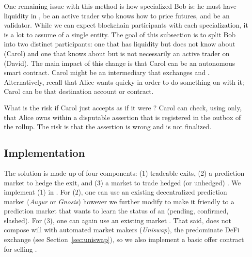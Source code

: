 One remaining issue with this method is how specialized Bob is: he must have liquidity in \ethone, be an active trader who knows how to price futures, and be an \layertwo validator. While we can expect blockchain participants with each specialization, it is a lot to assume of a single entity. The goal of this subsection is to split Bob into two distinct participants: one that has \ethone liquidity but does not know about \layertwo (Carol) and one that knows about \layertwo but is not necessarily an active trader on \layerone (David). The main impact of this change is that Carol can be an autonomous \layerone smart contract. Carol might be an intermediary that exchanges \ethxx and \ethone. Alternatively, recall that Alice wants \ethone quicky in order to do something on \layerone with it; Carol can be that destination account or contract.

What is the risk if Carol just accepts \ethxx as if it were \ethone? Carol can check, using \layerone only, that Alice owns \ethxx within a disputable assertion that is registered in the \layerone outbox of the rollup. The risk is that the assertion is wrong and is not finalized. 


\subsection{Implementation} 

The solution is made up of four components: (1) tradeable exits, (2) a prediction market to hedge the exit, and (3) a market to trade hedged (or unhedged) \ethxx. We implement (1) in \arb \nitro. For (2), one can use an existing decentralized prediction market (\eg \textit{Augur} or \textit{Gnosis}) however we further modify \arb \nitro to make it friendly to a prediction market that wants to learn the status of an \rblock (pending, confirmed, slashed). For (3), one can again use an existing market . That said, \ethxx does not compose will with automated market makers (\eg \textit{Uniswap}), the predominate DeFi exchange (see Section~\ref{sec:uniswap}), so we also implement a basic offer contract for selling \ethxx.


